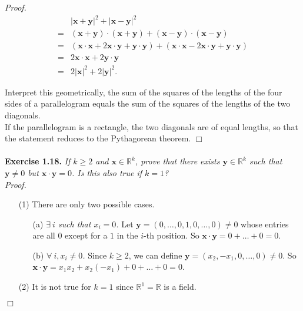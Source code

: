\documentclass{article}
\begin{document}
\emph{Proof.}
\begin{align*}
&|\mathbf{x}+\mathbf{y}|^2 + |\mathbf{x}-\mathbf{y}|^2 \\
=& (\mathbf{x}+\mathbf{y})\cdot(\mathbf{x}+\mathbf{y})
  + (\mathbf{x}-\mathbf{y})\cdot(\mathbf{x}-\mathbf{y}) \\
=& (\mathbf{x}\cdot\mathbf{x} + 2\mathbf{x}\cdot\mathbf{y} + \mathbf{y}\cdot\mathbf{y})
  + (\mathbf{x}\cdot\mathbf{x} - 2\mathbf{x}\cdot\mathbf{y} + \mathbf{y}\cdot\mathbf{y}) \\
=& 2\mathbf{x}\cdot\mathbf{x} + 2\mathbf{y}\cdot\mathbf{y} \\
=& 2|\mathbf{x}|^2 + 2|\mathbf{y}|^2.
\end{align*}

Interpret this geometrically,
the sum of the squares of the lengths of the four sides of a parallelogram
equals the sum of the squares of the lengths of the two diagonals. \\

If the parallelogram is a rectangle, the two diagonals are of equal lengths,
so that the statement reduces to the Pythagorean theorem.
$\Box$ \\\\






\textbf{Exercise 1.18.}
\emph{If $k \geq 2$ and $\mathbf{x} \in \mathbb{R}^k$,
prove that there exists $\mathbf{y} \in \mathbb{R}^k$ such that
$\mathbf{y} \neq 0$ but $\mathbf{x} \cdot \mathbf{y} = 0$.
Is this also true if $k = 1$?} \\

\emph{Proof.}
\begin{enumerate}
\item[(1)]
There are only two possible cases.
  \begin{enumerate}
  \item[(a)]
  \emph{$\exists \: i$ such that $x_i = 0$.}
  Let $\mathbf{y} = (0, \ldots, 0, 1, 0, \ldots, 0) \neq 0$
  whose entries are all $0$ except for a $1$ in the $i$-th position.
  So $\mathbf{x} \cdot \mathbf{y} = 0 + \ldots + 0 = 0$.
  \item[(b)]
  \emph{$\forall \: i, x_i \neq 0$.}
  Since $k \geq 2$, we can define
  $\mathbf{y} = (x_2, -x_1, 0, \ldots, 0) \neq 0.$
  So $\mathbf{x} \cdot \mathbf{y} = x_1 x_2 + x_2 (-x_1) + 0 + \ldots + 0 = 0$.
  \end{enumerate}
\item[(2)]
It is not true for $k = 1$ since $\mathbb{R}^1 = \mathbb{R}$ is a field.
\end{enumerate}
$\Box$ \\\\
\end{document}
